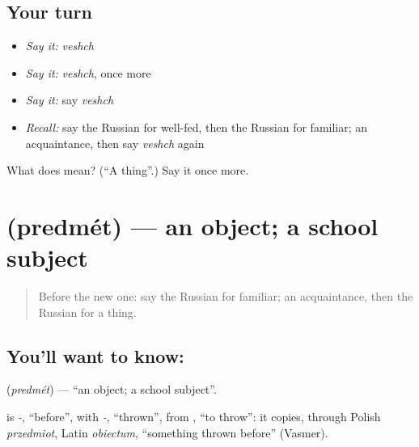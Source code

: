 \subsection*{Your turn}
\begin{itemize}
\raggedright
  \item \emph{Say it:} \emph{veshch}
  \item \emph{Say it:} \emph{veshch}, once more
  \item \emph{Say it:} say \emph{veshch}
  \item \emph{Recall:} say the Russian for well-fed, then the Russian for familiar; an acquaintance, then say \emph{veshch} again
\end{itemize}

\begin{tcolorbox}[breakable,colback=teal!4,colframe=teal!35!black,title={Before you move on}]
What does  mean? (\textquotedblleft{}A thing\textquotedblright{}.) Say it once more.
\end{tcolorbox}
\section[\texorpdfstring{\ru{предмет} (predmét)}{предмет (predmét)}]{ (predmét) — an object; a school subject}

\label{lesson:RU-C159-predmet}



\begin{quote}
Before the new one: say the Russian for familiar; an acquaintance, then the Russian for a thing.
\end{quote}

\subsection*{You'll want to know: }
\textbf{} (\emph{predmét}) — \textquotedblleft{}an object; a school subject\textquotedblright{}.

\begin{cousinweb}
\textbf{} is \emph{-}, \textquotedblleft{}before\textquotedblright{}, with \emph{-}, \textquotedblleft{}thrown\textquotedblright{}, from \emph{}, \textquotedblleft{}to throw\textquotedblright{}: it copies, through Polish \emph{przedmiot}, Latin \emph{obiectum}, \textquotedblleft{}something thrown before\textquotedblright{} (Vasmer).
\end{cousinweb}

